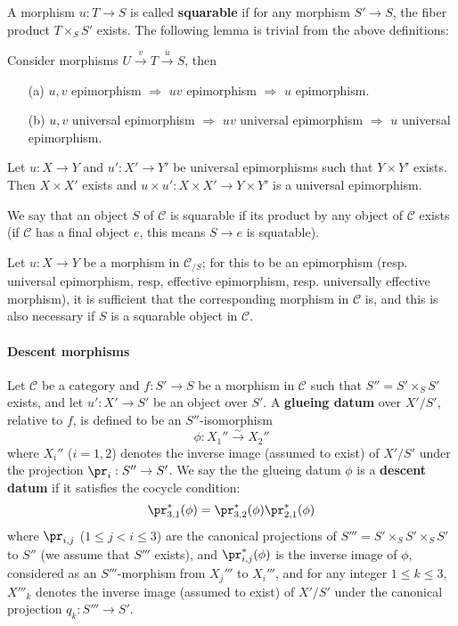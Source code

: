 A morphism $u:T\to S$ is called \textbf{squarable} if for any morphism $S'\to S$, the fiber product $T\times_SS'$ exists. The following lemma is trivial from the above definitions:
\begin{lemma}\label{category universal epi and composition}
Consider morphisms $U\stackrel{v}{\to}T\stackrel{u}{\to} S$, then
\begin{enumerate}
    \item[(a)] $u,v$ epimorphism $\Rightarrow$ $uv$ epimorphism $\Rightarrow$ $u$ epimorphism.
    \item[(b)] $u,v$ universal epimorphism $\Rightarrow$ $uv$ universal epimorphism $\Rightarrow$ $u$ universal epimorphism.
\end{enumerate}
\end{lemma}
\begin{corollary}
Let $u:X\to Y$ and $u':X'\to Y'$ be universal epimorphisms such that $Y\times Y'$ exists. Then $X\times X'$ exists and $u\times u':X\times X'\to Y\times Y'$ is a universal epimorphism.
\end{corollary}

\begin{definition}
We say that an object $S$ of $\mathcal{C}$ is squarable if its product by any object of $\mathcal{C}$ exists (if $\mathcal{C}$ has a final object $e$, this means $S\to e$ is squatable).
\end{definition}

\begin{lemma}\label{category effective epimorphism in C/S iff in C}
Let $u:X\to Y$ be a morphism in $\mathcal{C}_{/S}$; for this to be an epimorphism (resp. universal epimorphism, resp, effective epimorphism, resp. universally effective morphism), it is sufficient that the corresponding morphism in $\mathcal{C}$ is, and this is also necessary if $S$ is a squarable object in $\mathcal{C}$.
\end{lemma}

\paragraph{Descent morphisms}
Let $\mathcal{C}$ be a category and $f:S'\to S$ be a morphism in $\mathcal{C}$ such that $S''=S'\times_SS'$ exists, and let $u':X'\to S'$ be an object over $S'$. A \textbf{glueing datum} over $X'/S'$, relative to $f$, is defined to be an $S''$-isomorphism
\[\phi:X_1''\stackrel{\sim}{\to} X_2''\]
where $X_i''$ ($i=1,2$) denotes the inverse image (assumed to exist) of $X'/S'$ under the projection $\pr_i:S''\to S'$. We say the the glueing datum $\phi$ is a \textbf{descent datum} if it satisfies the cocycle condition:
\[\pr_{3,1}^*(\phi)=\pr_{3,2}^*(\phi)\pr_{2,1}^*(\phi)\]
where $\pr_{i,j}$ ($1\leq j<i\leq 3$) are the canonical projections of $S'''=S'\times_SS'\times_SS'$ to $S''$ (we assume that $S'''$ exists), and $\pr_{i,j}^*(\phi)$ is the inverse image of $\phi$, considered as an $S'''$-morphism from $X_j'''$ to $X_i'''$, and for any integer $1\leq k\leq 3$, $X'''_k$ denotes the inverse image (assumed to exist) of $X'/S'$ under the canonical projection $q_k:S'''\to S'$.\par

